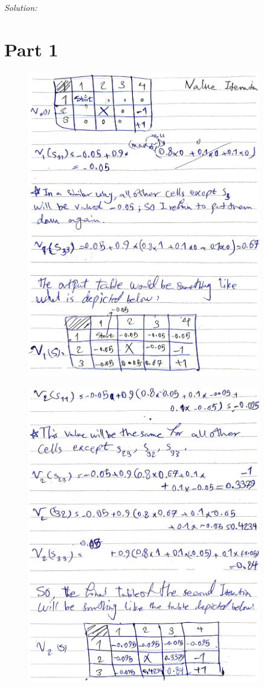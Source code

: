 \documentclass[a4paper, 11pt]{article}
\newenvironment{solution}
    {\textit{Solution:}}
    {}
\begin{document}
{\begin{solution}
 	\section*{\small Part 1}
 	\begin{figure}[H]
 		\centering
 		\includegraphics[width=0.9\textwidth]{1.jpg}
 	\end{figure}
 	\begin{figure}[H]
 		\centering
 		\includegraphics[width=0.9\textwidth]{2.jpg}
 	\end{figure}

\end{solution}}
\end{document}
